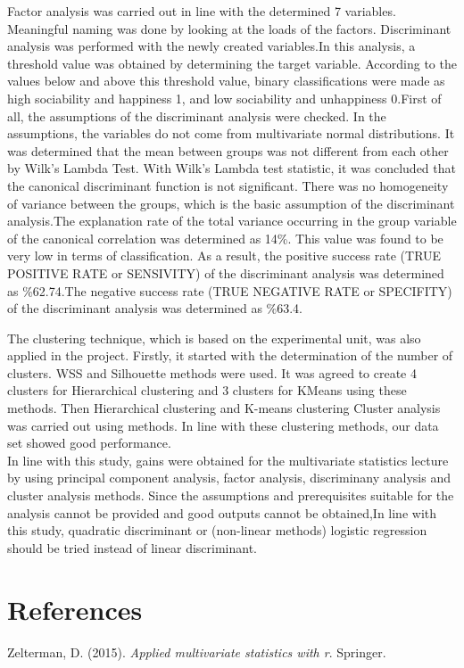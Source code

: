\documentclass[12pt,twoside]{deuthesis}
\begin{document}
Factor analysis was carried out in line with the determined 7 variables. Meaningful naming was done by looking at the loads of the factors. Discriminant analysis was performed with the newly created variables.In this analysis, a threshold value was obtained by determining the target variable. According to the values below and above this threshold value, binary classifications were made as high sociability and happiness 1, and low sociability and unhappiness 0.First of all, the assumptions of the discriminant analysis were checked. In the assumptions, the variables do not come from multivariate normal distributions. It was determined that the mean between groups was not different from each other by Wilk's Lambda Test. With Wilk's Lambda test statistic, it was concluded that the canonical discriminant function is not significant. There was no homogeneity of variance between the groups, which is the basic assumption of the discriminant analysis.The explanation rate of the total variance occurring in the group variable of the canonical correlation was determined as 14\%. This value was found to be very low in terms of classification. As a result, the positive success rate (TRUE POSITIVE RATE or SENSIVITY) of the discriminant analysis was determined as \%62.74.The negative success rate (TRUE NEGATIVE RATE or SPECIFITY) of the discriminant analysis was determined as \%63.4.

The clustering technique, which is based on the experimental unit, was also applied in the project. Firstly, it started with the determination of the number of clusters. WSS and Silhouette methods were used. It was agreed to create 4 clusters for Hierarchical clustering and 3 clusters for KMeans using these methods. Then Hierarchical clustering and K-means clustering
Cluster analysis was carried out using methods. In line with these clustering methods, our data set
showed good performance.\\

In line with this study, gains were obtained for the multivariate statistics lecture by using principal component analysis, factor analysis, discriminany analysis and cluster analysis methods.
Since the assumptions and prerequisites suitable for the analysis cannot be provided and good outputs cannot be obtained,In line with this study, quadratic discriminant or (non-linear methods) logistic regression should be tried instead of linear discriminant.

\hypertarget{references}{%
\chapter*{References}\label{references}}


\hypertarget{refs}{}
\begin{CSLReferences}{1}{0}
\leavevmode{}%
Zelterman, D. (2015). \emph{Applied multivariate statistics with r}. Springer.

\end{CSLReferences}
\setlength{\parindent}{-0.20in}
\setlength{\leftskip}{0.20in}
\setlength{\parskip}{8pt}
\end{document}
